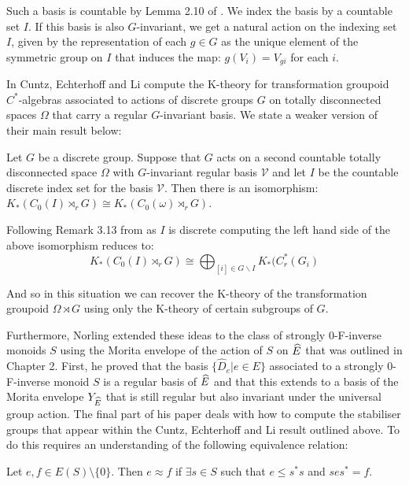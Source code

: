 Such a basis is countable by Lemma 2.10 of \cite{CEL-2}. We index the basis by a countable set $I$. If this basis is also $G$-invariant, we get a natural action on the indexing set $I$, given by the representation of each $g \in G$ as the unique element of the symmetric group on $I$ that induces the map: $g(V_{i})=V_{gi}$ for each $i$.

In \cite{CEL-2} Cuntz, Echterhoff and Li compute the K-theory for transformation groupoid $C^{*}$-algebras associated to actions of discrete groups $G$ on totally disconnected spaces $\Omega$ that carry a regular $G$-invariant basis. We state a weaker version of their main result below:

\begin{theorem}\label{Thm:Li}
Let $G$ be a discrete group. Suppose that $G$ acts on a second countable totally disconnected space $\Omega$ with $G$-invariant regular basis $\mathcal{V}$ and let $I$ be the countable discrete index set for the basis $\mathcal{V}$. Then there is an isomorphism: $K_{*}(C_{0}(I) \rtimes_{r} G) \cong K_{*}(C_{0}(\omega)\rtimes_{r}G)$.
\end{theorem}

Following Remark 3.13 from \cite{CEL-2} as $I$ is discrete computing the left hand side of the above isomorphism reduces to: 
\begin{equation*}
K_{*}(C_{0}(I)\rtimes_{r}G) \cong \bigoplus_{[i] \in G \backslash I} K_{*}(C^{*}_{r}(G_{i})
\end{equation*}

And so in this situation we can recover the K-theory of the transformation groupoid $\Omega \rtimes G$ using only the K-theory of certain subgroups of $G$.

Furthermore, Norling \cite{Nor-2012} extended these ideas to the class of strongly $0$-F-inverse monoids $S$ using the Morita envelope of the action of $S$ on $\widehat{E}$ that was outlined in Chapter 2. First, he proved that the basis $\lbrace \widehat{D}_{e} | e \in E \rbrace$ associated to a strongly $0$-F-inverse monoid $S$ is a regular basis of $\widehat{E}$ and that this extends to a basis of the Morita envelope $Y_{\widehat{E}}$ that is still regular but also invariant under the universal group action. The final part of his paper deals with how to compute the stabiliser groups that appear within the Cuntz, Echterhoff and Li result outlined above. To do this requires an understanding of the following equivalence relation:

\begin{definition}
Let $e,f \in E(S)\setminus \lbrace 0 \rbrace$. Then $e \approx f$ if $\exists s \in S$ such that $e \leq s^{*}s$ and $ses^{*}=f$.
\end{definition}

